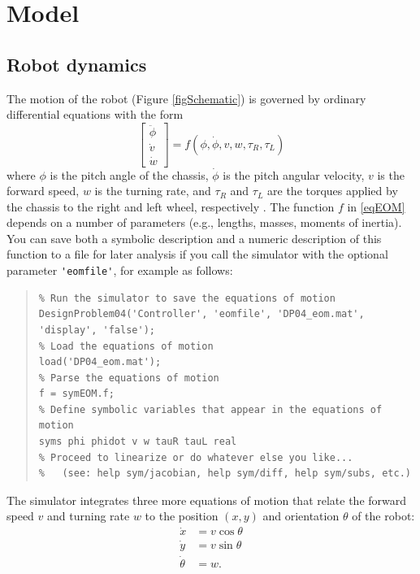 \documentclass[conf]{new-aiaa}
\begin{document}
\section{Model}

\subsection{Robot dynamics}
\label{secRobot}

The motion of the robot (Figure \ref{figSchematic}) is governed by ordinary differential equations with the form
\begin{equation}
\label{eqEOM}
\begin{bmatrix} \ddot{\phi} \\ \dot{v} \\ \dot{w} \end{bmatrix} = f(\phi,\dot{\phi},v,w,\tau_{R},\tau_{L})
\end{equation}
where $\phi$ is the pitch angle of the chassis, $\dot{\phi}$ is the pitch angular velocity, $v$ is the forward speed, $w$ is the turning rate, and $\tau_{R}$ and $\tau_{L}$ are the torques applied by the chassis to the right and left wheel, respectively \cite{Mak2015,Tobias2014}. The function $f$ in \eqref{eqEOM} depends on a number of parameters (e.g., lengths, masses, moments of inertia).
You can save both a symbolic description and a numeric description of this function to a file for later analysis if you call the simulator with the optional parameter \lstinline|'eomfile'|, for example as follows:
\begin{quote}
\begin{lstlisting}
% Run the simulator to save the equations of motion
DesignProblem04('Controller', 'eomfile', 'DP04_eom.mat', 'display', 'false');
% Load the equations of motion
load('DP04_eom.mat');
% Parse the equations of motion
f = symEOM.f;
% Define symbolic variables that appear in the equations of motion
syms phi phidot v w tauR tauL real
% Proceed to linearize or do whatever else you like...
% 	(see: help sym/jacobian, help sym/diff, help sym/subs, etc.)
\end{lstlisting}
\end{quote}
The simulator integrates three more equations of motion that relate the forward speed $v$ and turning rate $w$ to the position $(x,y)$ and orientation $\theta$ of the robot:
\begin{align*}
\dot{x} &= v\cos\theta \\
\dot{y} &= v\sin\theta \\
\dot{\theta} &= w.
\end{align*}
\end{document}
